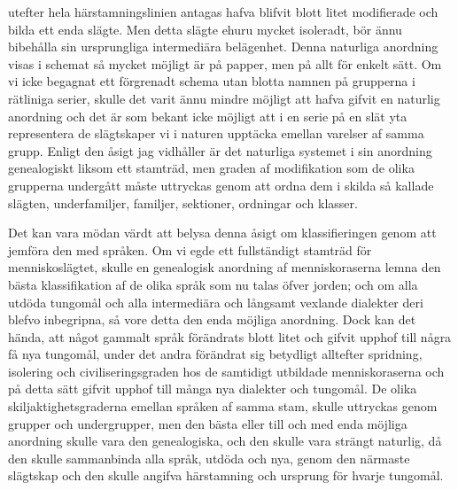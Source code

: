utefter hela härstamningslinien antagas hafva blifvit blott litet modifierade och bilda ett enda slägte. Men detta slägte ehuru mycket isoleradt, bör ännu bibehålla sin ursprungliga intermediära belägenhet. Denna naturliga anordning visas i schemat så mycket möjligt är på papper, men på allt för enkelt sätt. Om vi icke begagnat ett förgrenadt schema utan blotta namnen på grupperna i rätliniga serier, skulle det varit ännu mindre möjligt att hafva gifvit en naturlig anordning och det är som bekant icke möjligt att i en serie på en slät yta representera de slägtskaper vi i naturen upptäcka emellan varelser af samma grupp. Enligt den åsigt jag vidhåller är det naturliga systemet i sin anordning genealogiskt liksom ett stamträd, men graden af modifikation som de olika grupperna undergått måste uttryckas genom att ordna dem i skilda så kallade slägten, underfamiljer, familjer, sektioner, ordningar och klasser.

Det kan vara mödan värdt att belysa denna åsigt om klassifieringen genom att jemföra den med språken. Om vi egde ett fullständigt stamträd för menniskoslägtet, skulle en genealogisk anordning af menniskoraserna lemna den bästa klassifikation af de olika språk som nu talas öfver jorden; och om alla utdöda tungomål och alla intermediära och långsamt vexlande dialekter deri blefvo inbegripna, så vore detta den enda möjliga anordning. Dock kan det hända, att något gammalt språk förändrats blott litet och gifvit upphof till några få nya tungomål, under det andra förändrat sig betydligt alltefter spridning, isolering och civiliseringsgraden hos de samtidigt utbildade menniskoraserna och på detta sätt gifvit upphof till många nya dialekter och tungomål. De olika skiljaktighetsgraderna emellan språken af samma stam, skulle uttryckas genom grupper och undergrupper, men den bästa eller till och med enda möjliga anordning skulle vara den genealogiska, och den skulle vara strängt naturlig, då den skulle sammanbinda alla språk, utdöda och nya, genom den närmaste slägtskap och den skulle angifva härstamning och ursprung för hvarje tungomål.

